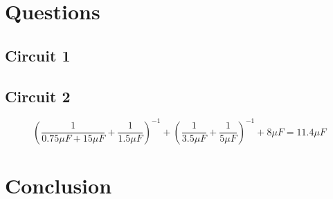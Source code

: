 \documentclass[titlepage]{article}
\begin{document}
	\section{Questions}


    	\subsection{Circuit 1}



    
    	\subsection{Circuit 2}
        $$\left( \frac{1}{0.75\mu F+15\mu F}+\frac{1}{1.5\mu F} \right)^{-1}+\left(\frac{1}{3.5\mu F}+\frac{1}{5\mu F}\right)^{-1}+8\mu F  = 11.4 \mu F$$

    
    
  	\section{Conclusion}
\end{document}
